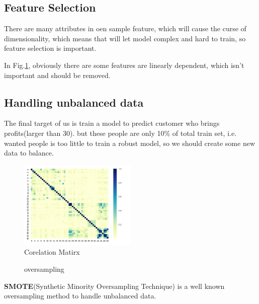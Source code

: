 \subsection{Feature Selection}
There are many attributes in oen sample feature, which will cause the curse of dimensionality, which means that will let model complex and hard to train, so feature selection is important.



In Fig.\ref{cor}, obviously there are some features are linearly dependent, which isn't important and should be removed. 

\subsection{Handling unbalanced data}
The final target of us is train a model to predict customer who brings profits(larger than 30). but these people are only 10\% of total train set, i.e. wanted people is too little to train a robust model, so we should create some new data to balance.

\begin{figure}[ht]
    \centering
    \includegraphics[width=0.5\textwidth]{img/Cor.png}
    \caption{Corelation Matirx}
    \label{cor}
\end{figure}

\begin{figure}[ht]
    \centering
    \label{1a}
    \label{1b}
  \caption{oversampling}
  \label{oversampling} 
  \end{figure}


\textbf{SMOTE}(Synthetic Minority Oversampling Technique) is a well known oversampling method to handle unbalanced data.